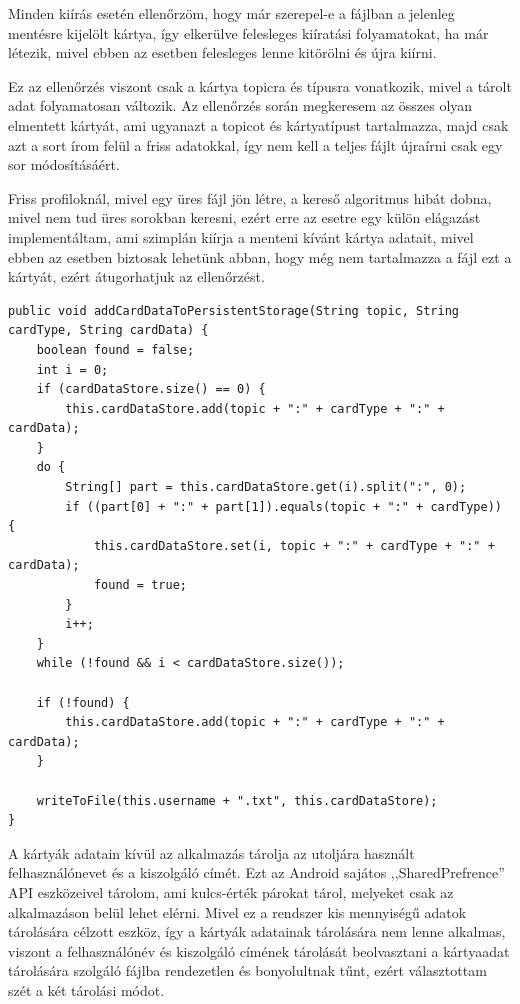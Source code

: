 \documentclass[]{thesis-ekf}
\theoremstyle{definition}
\theoremstyle{remark}
\begin{document}
Minden kiírás esetén ellenőrzöm, hogy már szerepel-e a fájlban a jelenleg mentésre kijelölt kártya, így elkerülve
felesleges kiíratási folyamatokat, ha már létezik, mivel ebben az esetben felesleges lenne kitörölni és újra kiírni.

Ez az ellenőrzés viszont csak a kártya topicra és típusra vonatkozik, mivel a tárolt adat folyamatosan változik.
Az ellenőrzés során megkeresem az összes olyan elmentett kártyát, ami ugyanazt a topicot és kártyatípust tartalmazza,
majd csak azt a sort írom felül a friss adatokkal, így nem kell a teljes fájlt újraírni csak egy sor módosításáért.

Friss profiloknál, mivel egy üres fájl jön létre, a kereső algoritmus hibát dobna, mivel nem tud üres sorokban
keresni, ezért erre az esetre egy külön elágazást implementáltam, ami szimplán kiírja a menteni kívánt kártya adatait,
mivel ebben az esetben biztosak lehetünk abban, hogy még nem tartalmazza a fájl ezt a kártyát, ezért átugorhatjuk az
ellenőrzést.


\lstset{language=Java}  
\begin{lstlisting}[frame=single]
public void addCardDataToPersistentStorage(String topic, String cardType, String cardData) {
	boolean found = false;
	int i = 0;
	if (cardDataStore.size() == 0) {
		this.cardDataStore.add(topic + ":" + cardType + ":" + cardData);
	}
	do {
		String[] part = this.cardDataStore.get(i).split(":", 0);
		if ((part[0] + ":" + part[1]).equals(topic + ":" + cardType)) {
			this.cardDataStore.set(i, topic + ":" + cardType + ":" + cardData);
			found = true;
		}
		i++;
	}
	while (!found && i < cardDataStore.size());

	if (!found) {
		this.cardDataStore.add(topic + ":" + cardType + ":" + cardData);
	}

	writeToFile(this.username + ".txt", this.cardDataStore);
}
\end{lstlisting}

A kártyák adatain kívül az alkalmazás tárolja az utoljára használt felhasználónevet és a kiszolgáló címét.
Ezt az Android sajátos ,,SharedPrefrence'' API eszközeivel tárolom, ami kulcs-érték párokat tárol, melyeket csak az
alkalmazáson belül lehet elérni.
Mivel ez a rendszer kis mennyiségű adatok tárolására célzott eszköz, így a kártyák adatainak tárolására nem lenne
alkalmas, viszont a felhasználónév és kiszolgáló címének tárolását beolvasztani a kártyaadat tárolására szolgáló
fájlba rendezetlen és bonyolultnak tűnt, ezért választottam szét a két tárolási módot.
\end{document}
